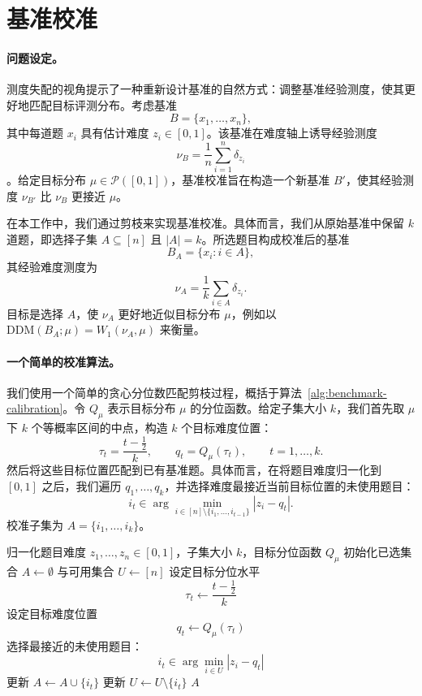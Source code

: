 \section{基准校准}
\label{sec:app_benchmark_cal}
\paragraph{问题设定。}
测度失配的视角提示了一种重新设计基准的自然方式：调整基准经验测度，使其更好地匹配目标评测分布。考虑基准
\[
B=\{x_1,\ldots,x_n\},
\]
其中每道题 \(x_i\) 具有估计难度 \(z_i\in[0,1]\)。该基准在难度轴上诱导经验测度
\[
\nu_B=\frac{1}{n}\sum_{i=1}^n \delta_{z_i}
\]
。给定目标分布 \(\mu\in\mathcal P([0,1])\)，基准校准旨在构造一个新基准 \(B'\)，使其经验测度 \(\nu_{B'}\) 比 \(\nu_B\) 更接近 \(\mu\)。

在本工作中，我们通过剪枝来实现基准校准。具体而言，我们从原始基准中保留 \(k\) 道题，即选择子集 \(A\subseteq[n]\) 且 \(|A|=k\)。所选题目构成校准后的基准
\[
B_A=\{x_i:i\in A\},
\]
其经验难度测度为
\[
\nu_A=\frac{1}{k}\sum_{i\in A}\delta_{z_i}.
\]
目标是选择 \(A\)，使 \(\nu_A\) 更好地近似目标分布 \(\mu\)，例如以 \(\mathrm{DDM}(B_A;\mu)=W_1(\nu_A,\mu)\) 来衡量。 

\paragraph{一个简单的校准算法。}
我们使用一个简单的贪心分位数匹配剪枝过程，概括于算法~\ref{alg:benchmark-calibration}。令 \(Q_\mu\) 表示目标分布 \(\mu\) 的分位函数。给定子集大小 \(k\)，我们首先取 \(\mu\) 下 \(k\) 个等概率区间的中点，构造 \(k\) 个目标难度位置：
\[
\tau_t=\frac{t-\frac12}{k},\qquad
q_t=Q_\mu(\tau_t),\qquad t=1,\ldots,k .
\]
然后将这些目标位置匹配到已有基准题。具体而言，在将题目难度归一化到 \([0,1]\) 之后，我们遍历 \(q_1,\ldots,q_k\)，并选择难度最接近当前目标位置的未使用题目：
\[
i_t\in
\arg\min_{i\in [n]\setminus \{i_1,\ldots,i_{t-1}\}}
|z_i-q_t|.
\]
校准子集为 \(A=\{i_1,\ldots,i_k\}\)。

\begin{algorithm}[t]
\caption{分位数匹配的基准校准}
\label{alg:benchmark-calibration}
\begin{algorithmic}[1]
\Require 归一化题目难度 \(z_1,\ldots,z_n\in[0,1]\)，子集大小 \(k\)，目标分位函数 \(Q_\mu\)
\State 初始化已选集合 \(A\leftarrow\emptyset\) 与可用集合 \(U\leftarrow[n]\)
    \State 设定目标分位水平
    \[
    \tau_t \leftarrow \frac{t-\frac12}{k}
    \]
    \State 设定目标难度位置
    \[
    q_t \leftarrow Q_\mu(\tau_t)
    \]
    \State 选择最接近的未使用题目：
    \[
    i_t \in \arg\min_{i\in U}|z_i-q_t|
    \]
    \State 更新 \(A\leftarrow A\cup\{i_t\}\)
    \State 更新 \(U\leftarrow U\setminus\{i_t\}\)
\EndFor
\State \Return \(A\)
\end{algorithmic}
\end{algorithm}


